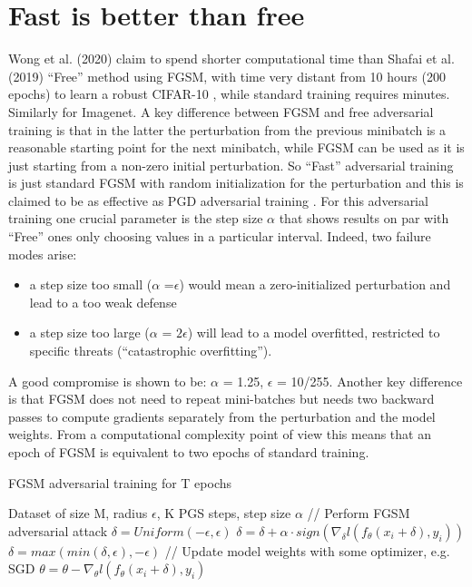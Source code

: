 \documentclass{article}
\begin{document}
\section{Fast is better than free}

Wong et al. (2020) \cite{WongEtAl2020} claim to spend shorter computational time than Shafai et al. (2019) \cite {ShafahiEtAl2019b} “Free” method using FGSM,  with time very distant from 10 hours (200 epochs) to learn a robust CIFAR-10 \cite{WongEtAl2020}, while standard training requires minutes. Similarly for Imagenet.  
A key difference between FGSM and free adversarial training is that in the latter the perturbation from the previous minibatch is a reasonable starting point for the next minibatch, while FGSM can be used as it is just starting from a non-zero initial perturbation.
So “Fast” adversarial training is just standard FGSM with random initialization for the perturbation and this is claimed to be as effective as PGD adversarial training \cite{WongEtAl2020}.
For this adversarial training one crucial parameter is the step size $\alpha$ that shows results on par with “Free” ones only choosing values in a particular interval. Indeed, two failure modes arise: 
\begin{itemize}

\item a step size too small ($\alpha$ =$\epsilon$) would mean a zero-initialized perturbation and lead to a too weak defense
\item a step size too large ($\alpha$ = $2\epsilon$) will lead to a model overfitted, restricted to specific threats (“catastrophic overfitting”).
\end{itemize}

A good compromise is shown to be: $\alpha$ = 1.25, $\epsilon$ = 10/255.
Another key difference is that FGSM does not need to repeat mini-batches but needs two backward passes to compute gradients separately from the perturbation and the model weights. From a computational complexity point of view this means that an epoch of FGSM is equivalent to two epochs of standard training.

\begin{algorithm}[H]
	\caption{FGSM adversarial training for T epochs}
	\begin{algorithmic}[1]
		\Require Dataset of size M, radius $\epsilon$, K PGS steps, step size $\alpha$
		\State // Perform FGSM adversarial attack
		\State $\delta = Uniform(-\epsilon, \epsilon)$
		\State $\delta = \delta + \alpha \cdot sign(\nabla_{\delta} l(f_{\theta}(x_i + \delta), y_i))$
		\State $\delta = max(min(\delta, \epsilon), -\epsilon)$
		\State // Update model weights with some optimizer, e.g. SGD
		\State $\theta = \theta - \nabla_{\theta} l(f_{\theta}(x_i + \delta), y_i)$
		\EndFor
		\EndFor
	\end{algorithmic}
\end{algorithm}
\end{document}

